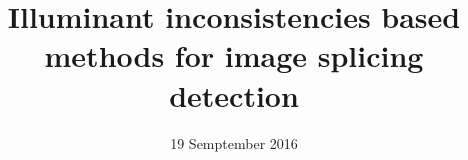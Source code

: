 \documentclass{beamer}
\author{}
\title{\huge Illuminant inconsistencies based methods for image splicing detection}
\date{19 Semptember 2016}
\begin{document}
\titlepageframe



\end{document}
